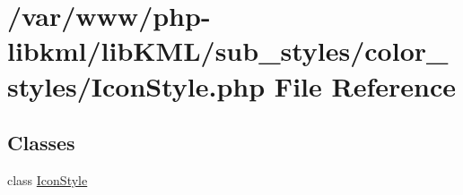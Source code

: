 \hypertarget{IconStyle_8php}{
\section{/var/www/php-\/libkml/libKML/sub\_\-styles/color\_\-styles/IconStyle.php File Reference}
\label{da/d4c/IconStyle_8php}
}
\subsection*{Classes}
\begin{DoxyCompactItemize}
\item 
class \hyperlink{classIconStyle}{IconStyle}
\end{DoxyCompactItemize}
